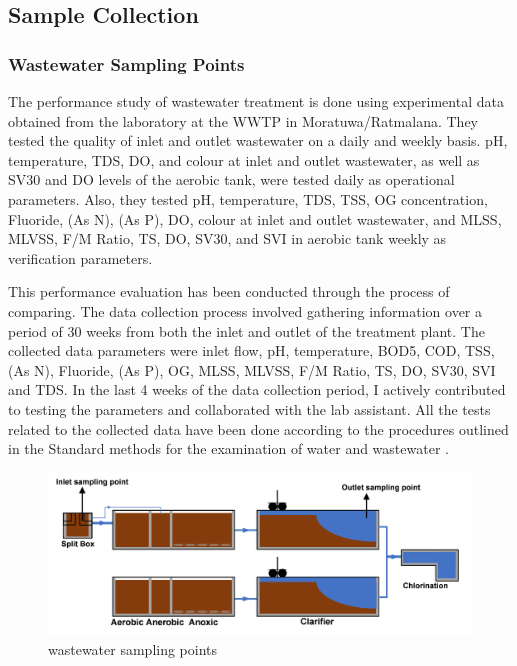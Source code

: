 \subsection{Sample Collection}

\subsubsection{Wastewater Sampling Points}
The performance study of wastewater treatment is done using experimental data obtained from the laboratory at the \ac{WWTP} in Moratuwa/Ratmalana. They tested the quality of inlet and outlet wastewater on a daily and weekly basis. pH, temperature, \ac{TDS}, \ac{DO}, and colour at inlet and outlet wastewater, as well as \ac{SV30} and \ac{DO} levels of the aerobic tank, were tested daily as operational parameters. Also, they tested pH, temperature, \ac{TDS}, \ac{TSS}, \ac{OG} concentration, Fluoride,  (As N),  (As P), \ac{DO}, colour at inlet and outlet wastewater, and \ac{MLSS}, \ac{MLVSS}, \ac{F/M Ratio}, \ac{TS}, \ac{DO}, \ac{SV30}, and \ac{SVI} in aerobic tank weekly as verification parameters.

This performance evaluation has been conducted through the process of comparing. The data collection process involved gathering information over a period of 30 weeks from both the inlet and outlet of the treatment plant. The collected data parameters were inlet flow, pH, temperature, \ac{BOD5}, \ac{COD}, \ac{TSS},  (As N), Fluoride,  (As P), \ac{OG}, \ac{MLSS}, \ac{MLVSS}, \ac{F/M Ratio}, \ac{TS}, \ac{DO}, \ac{SV30}, \ac{SVI} and \ac{TDS}. In the last 4 weeks of the data collection period, I actively contributed to testing the parameters and collaborated with the lab assistant. All the tests related to the collected data have been done according to the procedures outlined in the Standard methods for the examination of water and wastewater \cite{APHA}.


\begin{figure}[H]
\centering
\includegraphics[width=1\linewidth]{material_and_methodology/sample_point_inlet_outlet.png}


\caption{wastewater sampling points }
\label{fig:sample_points_inlet_outlet}
\end{figure}




